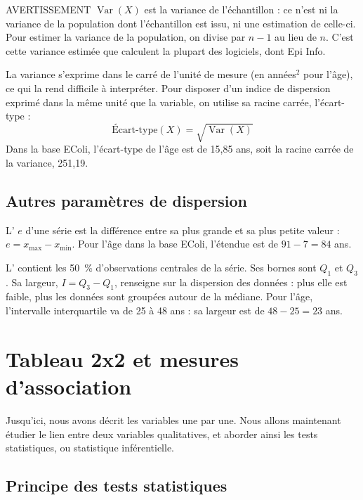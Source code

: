 \begin{mybox}[colbacktitle=CAUTION]{\faFire{} AVERTISSEMENT}
$\operatorname{Var}(X)$ est la variance de l'échantillon : ce n'est ni la variance de la population dont l'échantillon est issu, ni une estimation de celle-ci. Pour estimer la variance de la population, on divise par $n-1$ au lieu de $n$. C'est cette variance estimée que calculent la plupart des logiciels, dont Epi Info.
\end{mybox}

La variance s'exprime dans le carré de l'unité de mesure (en années$^2$ pour l'âge), ce qui la rend difficile à interpréter. Pour disposer d'un indice de dispersion exprimé dans la même unité que la variable, on utilise sa racine carrée, l'écart-type :
\[
\text{Écart-type}(X)=\sqrt{\operatorname{Var}(X)}
\]
Dans la base EColi, l'écart-type de l'âge est de 15,85 ans, soit la racine carrée de la variance, 251,19.

\subsection{Autres paramètres de dispersion}

L' $e$ d'une série est la différence entre sa plus grande et sa plus petite valeur : $e=x_{\max}-x_{\min}$. Pour l'âge dans la base EColi, l'étendue est de $91-7=84$ ans.

L' contient les 50~\% d'observations centrales de la série. Ses bornes sont $Q_1$ et $Q_3$. Sa largeur, $I = Q_3 - Q_1$, renseigne sur la dispersion des données : plus elle est faible, plus les données sont groupées autour de la médiane. Pour l'âge, l'intervalle interquartile va de 25 à 48 ans : sa largeur est de $48-25=23$ ans.

\section{Tableau 2x2 et mesures d'association}
\label{tableau2x2}

Jusqu'ici, nous avons décrit les variables une par une. Nous allons maintenant étudier le lien entre deux variables qualitatives, et aborder ainsi les tests statistiques, ou statistique inférentielle.

\subsection{Principe des tests statistiques}

